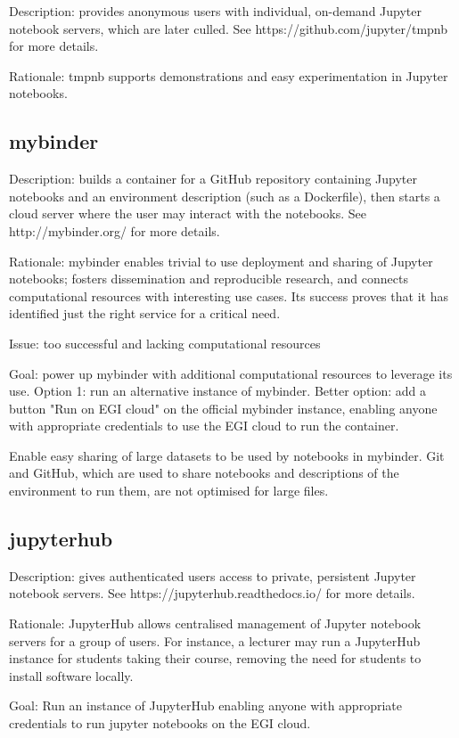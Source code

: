 Description: provides anonymous users with individual, on-demand Jupyter
notebook servers, which are later culled. See https://github.com/jupyter/tmpnb
for more details.

Rationale: tmpnb supports demonstrations and easy experimentation in
Jupyter notebooks.


\subsection{mybinder}

Description: builds a container for a GitHub repository containing
Jupyter notebooks and an environment description (such as a
Dockerfile), then starts a cloud server where the user may interact
with the notebooks. See http://mybinder.org/ for more details.

Rationale: mybinder enables trivial to use deployment and sharing of
Jupyter notebooks; fosters dissemination and reproducible research,
and connects computational resources with interesting use cases.
Its success proves that it has identified just the right service for
a critical need.

Issue: too successful and lacking computational resources

Goal: power up mybinder with additional computational resources to
leverage its use. Option 1: run an alternative instance of mybinder.
Better option: add a button "Run on EGI cloud" on the official
mybinder instance, enabling anyone with appropriate credentials to use
the EGI cloud to run the container.

Enable easy sharing of large datasets to be used by notebooks in mybinder. Git
and GitHub, which are used to share notebooks and descriptions of the
environment to run them, are not optimised for large files.

\subsection{jupyterhub}

Description: gives authenticated users access to private, persistent Jupyter
notebook servers. See https://jupyterhub.readthedocs.io/ for more details.

Rationale: JupyterHub allows centralised management of Jupyter notebook servers
for a group of users. For instance, a lecturer may run a JupyterHub instance for
students taking their course, removing the need for students to install software
locally.

Goal: Run an instance of JupyterHub enabling anyone with appropriate
credentials to run jupyter notebooks on the EGI cloud.

